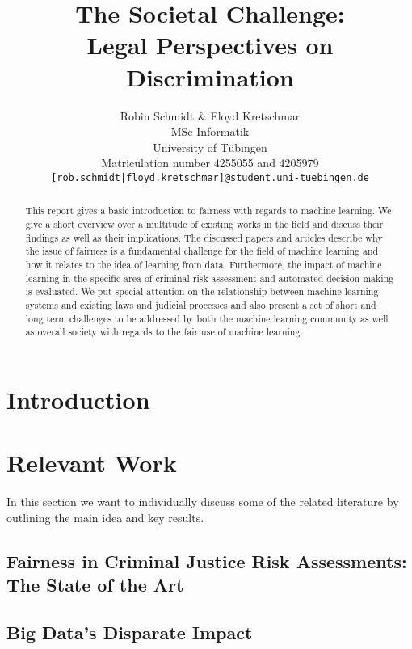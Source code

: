 \documentclass{article}
\title{The Societal Challenge: \\ Legal Perspectives on Discrimination}
\author{%
  Robin Schmidt \& Floyd Kretschmar\\
  MSc Informatik \\
  University of Tübingen\\
  Matriculation number 4255055 and 4205979\\
  \texttt{[rob.schmidt|floyd.kretschmar]@student.uni-tuebingen.de}
}
\begin{document}
\maketitle

\begin{abstract}
  This report gives a basic introduction to fairness with regards to machine learning. 
  We give a short overview over a multitude of existing works in the field and discuss their findings as well as their implications. The discussed papers and articles describe why the issue
  of fairness is a fundamental challenge for the field of machine learning and how it relates
  to the idea of learning from data. Furthermore, the impact of machine learning in the specific area of criminal risk assessment and automated decision making is evaluated. We put special attention on the relationship between machine learning systems and existing laws and judicial processes and also present a set of short and long term challenges to be 
  addressed by both the machine learning community as well as overall society with 
  regards to the fair use of machine learning.
\end{abstract}

\section{Introduction}
 \label{sec:introduction}

\section{Relevant Work}
In this section we want to individually discuss some of the related literature  \cite{machinebias, Barocas.2016, Berk.2018} by outlining the main idea and key results.

%

\subsection{Fairness in Criminal Justice Risk Assessments: The State of the Art}


\subsection{Big Data’s Disparate Impact}

\end{document}

